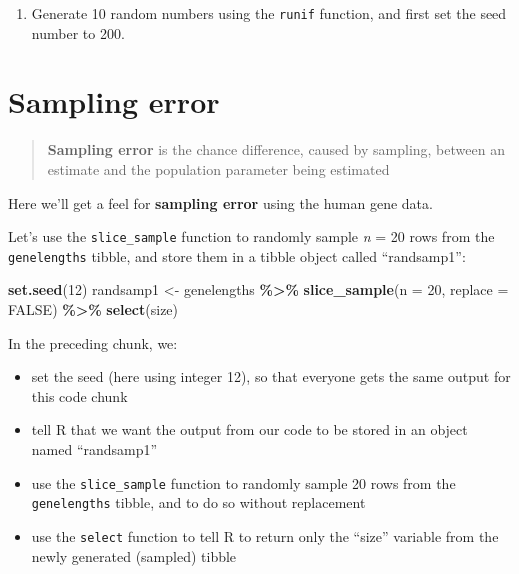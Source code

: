 \documentclass[
]{book}
\newenvironment{Shaded}{\begin{snugshade}}{\end{snugshade}}
\newcommand{\AttributeTok}[1]{\textcolor[rgb]{0.13,0.29,0.53}{#1}}
\newcommand{\ConstantTok}[1]{\textcolor[rgb]{0.56,0.35,0.01}{#1}}
\newcommand{\DecValTok}[1]{\textcolor[rgb]{0.00,0.00,0.81}{#1}}
\newcommand{\FunctionTok}[1]{\textcolor[rgb]{0.13,0.29,0.53}{\textbf{#1}}}
\newcommand{\NormalTok}[1]{#1}
\newcommand{\OtherTok}[1]{\textcolor[rgb]{0.56,0.35,0.01}{#1}}
\newcommand{\SpecialCharTok}[1]{\textcolor[rgb]{0.81,0.36,0.00}{\textbf{#1}}}
\providecommand{\tightlist}{%
  \setlength{\itemsep}{0pt}\setlength{\parskip}{0pt}}
\begin{document}
\begin{enumerate}
\def\labelenumi{\arabic{enumi}.}
\tightlist
\item
  Generate 10 random numbers using the \texttt{runif} function, and first set the seed number to 200.
\end{enumerate}

\section{Sampling error}\label{sampling_error}

\begin{quote}
\textbf{Sampling error} is the chance difference, caused by sampling, between an estimate and the population parameter being estimated
\end{quote}

Here we'll get a feel for \textbf{sampling error} using the human gene data.

Let's use the \texttt{slice\_sample} function to randomly sample \emph{n} = 20 rows from the \texttt{genelengths} tibble, and store them in a tibble object called ``randsamp1'':

\begin{Shaded}
\begin{Highlighting}[]
\FunctionTok{set.seed}\NormalTok{(}\DecValTok{12}\NormalTok{)}
\NormalTok{randsamp1 }\OtherTok{\textless{}{-}}\NormalTok{ genelengths }\SpecialCharTok{\%\textgreater{}\%}
  \FunctionTok{slice\_sample}\NormalTok{(}\AttributeTok{n =} \DecValTok{20}\NormalTok{, }\AttributeTok{replace =} \ConstantTok{FALSE}\NormalTok{) }\SpecialCharTok{\%\textgreater{}\%}
  \FunctionTok{select}\NormalTok{(size)}
\end{Highlighting}
\end{Shaded}

In the preceding chunk, we:

\begin{itemize}
\tightlist
\item
  set the seed (here using integer 12), so that everyone gets the same output for this code chunk
\item
  tell R that we want the output from our code to be stored in an object named ``randsamp1''
\item
  use the \texttt{slice\_sample} function to randomly sample 20 rows from the \texttt{genelengths} tibble, and to do so without replacement
\item
  use the \texttt{select} function to tell R to return only the ``size'' variable from the newly generated (sampled) tibble
\end{itemize}
\end{document}
